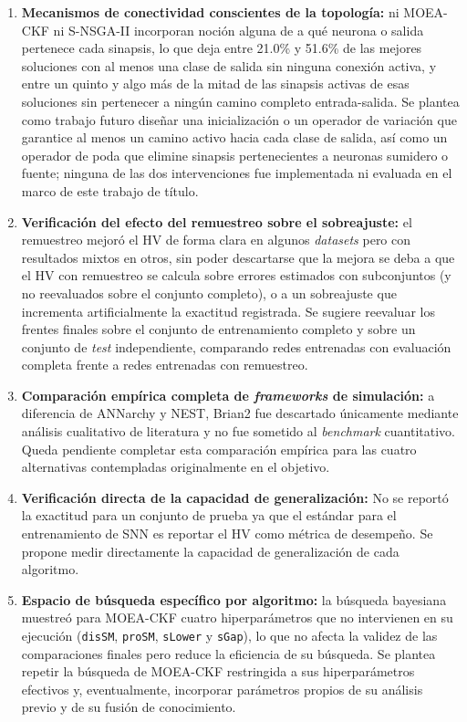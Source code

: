 \begin{enumerate}
    \item \textbf{Mecanismos de conectividad conscientes de la topología:} ni MOEA-CKF ni S-NSGA-II incorporan noción alguna de a qué neurona o salida pertenece cada sinapsis, lo que deja entre 21.0\% y 51.6\% de las mejores soluciones con al menos una clase de salida sin ninguna conexión activa, y entre un quinto y algo más de la mitad de las sinapsis activas de esas soluciones sin pertenecer a ningún camino completo entrada-salida. Se plantea como trabajo futuro diseñar una inicialización o un operador de variación que garantice al menos un camino activo hacia cada clase de salida, así como un operador de poda que elimine sinapsis pertenecientes a neuronas sumidero o fuente; ninguna de las dos intervenciones fue implementada ni evaluada en el marco de este trabajo de título.

    \item \textbf{Verificación del efecto del remuestreo sobre el sobreajuste:} el remuestreo mejoró el HV de forma clara en algunos \textit{datasets} pero con resultados mixtos en otros, sin poder descartarse que la mejora se deba a que el HV con remuestreo se calcula sobre errores estimados con subconjuntos (y no reevaluados sobre el conjunto completo), o a un sobreajuste que incrementa artificialmente la exactitud registrada. Se sugiere reevaluar los frentes finales sobre el conjunto de entrenamiento completo y sobre un conjunto de \textit{test} independiente, comparando redes entrenadas con evaluación completa frente a redes entrenadas con remuestreo.

    \item \textbf{Comparación empírica completa de \textit{frameworks} de simulación:} a diferencia de ANNarchy y NEST, Brian2 fue descartado únicamente mediante análisis cualitativo de literatura y no fue sometido al \textit{benchmark} cuantitativo. Queda pendiente completar esta comparación empírica para las cuatro alternativas contempladas originalmente en el objetivo.

    \item \textbf{Verificación directa de la capacidad de generalización:} No se reportó la exactitud para un conjunto de prueba ya que el estándar para el entrenamiento de SNN es reportar el HV como métrica de desempeño. Se propone medir directamente la capacidad de generalización de cada algoritmo.

    \item \textbf{Espacio de búsqueda específico por algoritmo:} la búsqueda bayesiana muestreó para MOEA-CKF cuatro hiperparámetros que no intervienen en su ejecución (\texttt{disSM}, \texttt{proSM}, \texttt{sLower} y \texttt{sGap}), lo que no afecta la validez de las comparaciones finales pero reduce la eficiencia de su búsqueda. Se plantea repetir la búsqueda de MOEA-CKF restringida a sus hiperparámetros efectivos y, eventualmente, incorporar parámetros propios de su análisis previo y de su fusión de conocimiento.


\end{enumerate}
